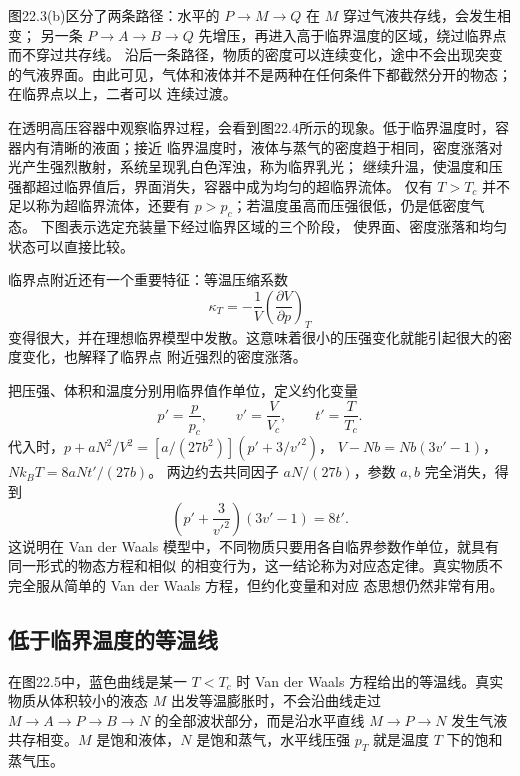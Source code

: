 图22.3(b)区分了两条路径：水平的 $P\to M\to Q$ 在 $M$ 穿过气液共存线，会发生相变；
另一条 $P\to A\to B\to Q$ 先增压，再进入高于临界温度的区域，绕过临界点而不穿过共存线。
沿后一条路径，物质的密度可以连续变化，途中不会出现突变
的气液界面。由此可见，气体和液体并不是两种在任何条件下都截然分开的物态；在临界点以上，二者可以
连续过渡。

在透明高压容器中观察临界过程，会看到图22.4所示的现象。低于临界温度时，容器内有清晰的液面；接近
临界温度时，液体与蒸气的密度趋于相同，密度涨落对光产生强烈散射，系统呈现乳白色浑浊，称为临界乳光；
继续升温，使温度和压强都超过临界值后，界面消失，容器中成为均匀的超临界流体。
仅有 $T>T_c$ 并不足以称为超临界流体，还要有 $p>p_c$；若温度虽高而压强很低，仍是低密度气态。
下图表示选定充装量下经过临界区域的三个阶段，
使界面、密度涨落和均匀状态可以直接比较。

\criticalApparatusFigure
{}

临界点附近还有一个重要特征：等温压缩系数
\[
  \kappa_T=-\frac1V\left(\frac{\partial V}{\partial p}\right)_T
\]
变得很大，并在理想临界模型中发散。这意味着很小的压强变化就能引起很大的密度变化，也解释了临界点
附近强烈的密度涨落。

把压强、体积和温度分别用临界值作单位，定义约化变量
\begin{equation}
  \boxed{p'=\frac{p}{p_c},\qquad v'=\frac{V}{V_c},\qquad t'=\frac{T}{T_c}}.
  \tag{22.4}
\end{equation}
代入时，$p+aN^2/V^2=[a/(27b^2)](p'+3/v'^2)$，
$V-Nb=Nb(3v'-1)$，$Nk_BT=8aNt'/(27b)$。
两边约去共同因子 $aN/(27b)$，参数 $a,b$ 完全消失，得到
\begin{equation}
  \boxed{\left(p'+\frac{3}{v'^2}\right)(3v'-1)=8t'}.
  \tag{22.5}
\end{equation}
这说明在 Van der Waals 模型中，不同物质只要用各自临界参数作单位，就具有同一形式的物态方程和相似
的相变行为，这一结论称为对应态定律。真实物质不完全服从简单的 Van der Waals 方程，但约化变量和对应
态思想仍然非常有用。

\subsection*{低于临界温度的等温线}

在图22.5中，蓝色曲线是某一 $T<T_c$ 时 Van der Waals 方程给出的等温线。真实物质从体积较小的液态
$M$ 出发等温膨胀时，不会沿曲线走过 $M\to A\to P\to B\to N$ 的全部波状部分，而是沿水平直线
$M\to P\to N$ 发生气液共存相变。$M$ 是饱和液体，$N$ 是饱和蒸气，水平线压强 $p_T$ 就是温度 $T$
下的饱和蒸气压。


